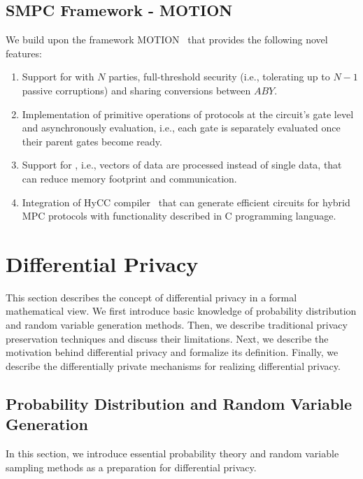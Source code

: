 \subsection{SMPC Framework - MOTION}
\label{subsection:MOTIONFramework}
We build upon the \smpc framework MOTION~\cite{braun2022motion} that provides the following novel features:
\begin{enumerate}
    \item Support for \smpc with $N$ parties, full-threshold security (i.e., tolerating up to $N-1$ passive corruptions) and sharing conversions between $ABY$.
    \item Implementation of primitive operations of \smpc protocols at the circuit's gate level and asynchronously evaluation, i.e., each gate is separately evaluated once their parent gates become ready.
    \item Support for \simd, i.e., vectors of data are processed instead of single data, that can reduce memory footprint and communication.
    \item Integration of HyCC compiler~\cite{buscher2018hycc} that can generate efficient circuits for hybrid MPC protocols with functionality described in C programming language.
\end{enumerate}


\section{Differential Privacy}
\label{sec:differentialPrivacy}
This section describes the concept of differential privacy in a formal mathematical view. We first introduce basic knowledge of probability distribution and random variable generation methods. Then, we describe traditional privacy preservation techniques and discuss their limitations. Next, we describe the motivation behind differential privacy and formalize its definition. Finally, we describe the differentially private mechanisms for realizing differential privacy.

\subsection{Probability Distribution and Random Variable Generation}
\label{subsec:probabilityDistribution}
In this section, we introduce essential probability theory and random variable sampling methods as a preparation for differential privacy.

